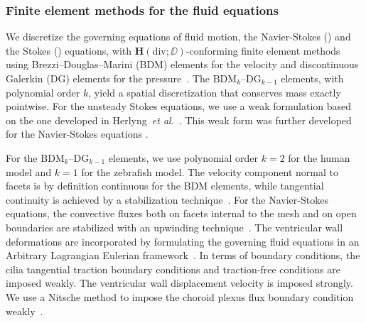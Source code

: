 \documentclass{template}
\begin{document}
\subsubsection{Finite element methods for the fluid equations}
We discretize the governing equations of fluid motion,
the Navier-Stokes ()
and the Stokes ()
equations, with $\bm{H}(\mathrm{div}; \DD)$-conforming finite element methods
using Brezzi--Douglas--Marini (BDM) elements for the velocity
and discontinuous Galerkin (DG)
elements for the pressure~\cite{Brezzi1985TwoProblems,Nedelec1986AIR3}.
The $\mathrm{BDM}_k$--$\mathrm{DG}_{k-1}$ elements, with polynomial order $k$,
yield a spatial discretization that conserves mass exactly pointwise.
For the unsteady Stokes equations, we use a weak formulation
based on the one developed in
Herlyng~\emph{et al.}~\cite{Herlyng2025AdvectionDiffusion}.
This weak form was further developed for the Navier-Stokes equations
\cite{Schroeder2018Towards,di2011mathematical}.

For the $\mathrm{BDM}_k$--$\mathrm{DG}_{k-1}$ elements, we use
polynomial order $k=2$ for the human model and $k=1$ for the 
zebrafish model. The velocity component normal to facets is by definition 
continuous for the BDM elements, while tangential continuity is achieved
by a stabilization technique~\cite{Hong2016AEquations}. 
For the Navier-Stokes equations, the convective fluxes both on facets
internal to the mesh and on open boundaries are stabilized with
an upwinding technique~\cite{Schroeder2018Towards,
di2011mathematical}. The ventricular wall deformations
are incorporated by formulating the governing fluid equations
in an Arbitrary Lagrangian Eulerian framework~\cite{Scovazzi2007LectureNotes,Duarte2004ALE}.
In terms of boundary conditions, the cilia tangential traction
boundary conditions and traction-free conditions are imposed weakly.
The ventricular wall displacement velocity is imposed strongly.
We use a Nitsche method to impose the choroid plexus flux boundary
condition weakly~\cite{Nitsche1971UberSind, benzaken2024constructing}.
\end{document}
